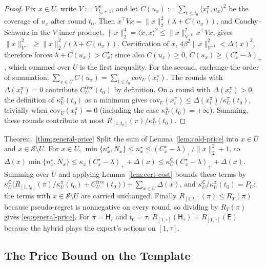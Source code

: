 \documentclass[anon]{alt2027} %
\newcommand{\Cold}{\mathsf{C}}
\newcommand{\Exp}{\mathsf{E}}
\newcommand{\Hyb}{\mathsf{H}}
\begin{document}
\begin{proof}
Fix $x\in U$, write $V:=V^\pi_{t_0+1}$, and let
$C(u_x):=\sum_{t\le t_0}\langle x^\pi_t,u_x\rangle^2$ be the coverage of $u_x$
after round $t_0$. Then $x^\top Vx=\|x\|_2^2(\lambda+C(u_x))$, and
Cauchy--Schwarz in the $V$ inner product,
$\|x\|_2^4=\langle x,x\rangle^2\le\|x\|^2_{V^{-1}}\,x^\top Vx$, gives
$\|x\|^2_{V^{-1}}\ge\|x\|_2^2/(\lambda+C(u_x))$. Certification of $x$,
$4\beta^2\|x\|^2_{V^{-1}}<\Delta(x)^2$, therefore forces
$\lambda+C(u_x)>C^\star_x$; since also $C(u_x)\ge0$, $C(u_x)\ge(C^\star_x-\lambda)_+$,
which summed over $U$ is the first inequality. For the second, exchange the
order of summation: $\sum_{x\in U}C(u_x)=\sum_{t\le t_0}\mathrm{cov}_U(x^\pi_t)$.
The rounds with $\Delta(x^\pi_t)=0$ contribute $C^{\mathrm{free}}_U(t_0)$ by
definition. On a round with $\Delta(x^\pi_t)>0$, the definition of
$\kappa^\pi_U(t_0)$ as a minimum gives
$\mathrm{cov}_U(x^\pi_t)\le\Delta(x^\pi_t)/\kappa^\pi_U(t_0)$, trivially when
$\mathrm{cov}_U(x^\pi_t)=0$ (including the case $\kappa^\pi_U(t_0)=+\infty$).
Summing, these rounds contribute at most $R_{[1,t_0]}(\pi)/\kappa^\pi_U(t_0)$.
\end{proof}

\begin{proofof}{Theorem~\ref{thm:general-price}}
Split the sum of Lemma~\ref{lem:cold-price} into $x\in U$ and $x\in \mathcal S\setminus U$. For
$x\in U$, $\min\{n^\star_x,N_x\}\le n^\star_x\le(C^\star_x-\lambda)_+/\|x\|_2^2+1$, so
$\Delta(x)\min\{n^\star_x,N_x\}\le\kappa_x(C^\star_x-\lambda)_++\Delta(x)\le\kappa^{\Cold}_U(C^\star_x-\lambda)_++\Delta(x)$.
Summing over $U$ and applying Lemma~\ref{lem:cert-cost} bounds these terms by
$\kappa^{\Cold}_U\bigl(R_{[1,t_0]}(\pi)/\kappa^\pi_U(t_0)+C^{\mathrm{free}}_U(t_0)\bigr)+\sum_{x\in U}\Delta(x)$,
and $\kappa^{\Cold}_U/\kappa^\pi_U(t_0)=P_U$; the terms with $x\in \mathcal S\setminus U$
are carried unchanged. Finally $R_{[1,t_0]}(\pi)\le R_T(\pi)$ because
pseudo-regret is nonnegative on every round, so dividing by $R_T(\pi)$ gives
\eqref{eq:general-price}. For $\pi=\Hyb_\tau$
and $t_0=\tau$, $R_{[1,\tau]}(\Hyb_\tau)=R_{[1,\tau]}(\Exp)$ because the
hybrid plays the expert's actions on $[1,\tau]$.
\end{proofof}

\subsection{The Price Bound on the Template}
\label{app:price-template}
\end{document}
